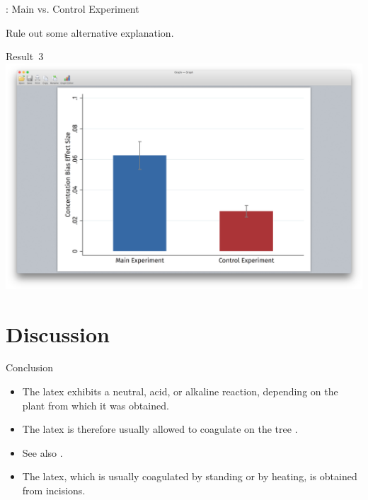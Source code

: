 \begin{frame}{\titleprefix: Main vs. Control Experiment}

	Rule out some alternative explanation.
	
	\bigskip
	
	\centering
	{\small \alert{Result~3}} \\[15pt]
	\includegraphics[height=0.5\textheight, trim={3.75in 1.75in 3.75in 2in}, clip]
		{1_Example_Content/Images/average_main_control.png}

\end{frame}


\section{Discussion}


\begin{frame}{Conclusion}

	\begin{itemize}
		\item The latex exhibits a neutral, acid, or alkaline reaction, depending on the plant from which it was obtained.
		\item The latex is therefore usually allowed to coagulate on the tree \citep{Koszegi2013}.
		\item See also \cite{Bordalo2013}.
		\item The latex, which is usually coagulated by standing or by heating, is obtained from incisions.
	\end{itemize}	

\end{frame}


